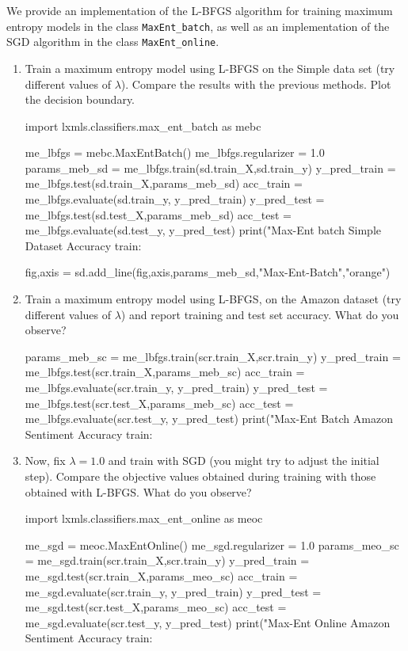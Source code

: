 \begin{exercise}
We provide an implementation of the L-BFGS algorithm for training maximum entropy models in the class {\tt MaxEnt\_batch}, 
as well as an implementation of the SGD algorithm in the class {\tt MaxEnt\_online}. 
\begin{enumerate}
\item Train a  maximum entropy model using L-BFGS on the Simple data
  set (try different values of $\lambda$). Compare the results with the previous methods. Plot the decision boundary. 
\begin{python}
import lxmls.classifiers.max_ent_batch as mebc

me_lbfgs = mebc.MaxEntBatch()
me_lbfgs.regularizer = 1.0
params_meb_sd = me_lbfgs.train(sd.train_X,sd.train_y)
y_pred_train = me_lbfgs.test(sd.train_X,params_meb_sd)
acc_train = me_lbfgs.evaluate(sd.train_y, y_pred_train)
y_pred_test = me_lbfgs.test(sd.test_X,params_meb_sd)
acc_test = me_lbfgs.evaluate(sd.test_y, y_pred_test)
print("Max-Ent batch Simple Dataset Accuracy train: %

fig,axis = sd.add_line(fig,axis,params_meb_sd,"Max-Ent-Batch","orange")
\end{python}

\item Train a maximum entropy model using L-BFGS, on the Amazon
  dataset (try different values of $\lambda$) and report training and test set accuracy. What do you observe? 
\begin{python}
params_meb_sc = me_lbfgs.train(scr.train_X,scr.train_y)
y_pred_train = me_lbfgs.test(scr.train_X,params_meb_sc)
acc_train = me_lbfgs.evaluate(scr.train_y, y_pred_train)
y_pred_test = me_lbfgs.test(scr.test_X,params_meb_sc)
acc_test = me_lbfgs.evaluate(scr.test_y, y_pred_test)
print("Max-Ent Batch Amazon Sentiment Accuracy train: %
\end{python}

\item Now, fix $\lambda = 1.0$ and train with SGD (you might try to adjust the initial step). 
Compare the objective values obtained during training with those obtained with L-BFGS. What do you observe? 
\begin{python}
import lxmls.classifiers.max_ent_online as meoc

me_sgd = meoc.MaxEntOnline()
me_sgd.regularizer = 1.0
params_meo_sc = me_sgd.train(scr.train_X,scr.train_y)
y_pred_train = me_sgd.test(scr.train_X,params_meo_sc)
acc_train = me_sgd.evaluate(scr.train_y, y_pred_train)
y_pred_test = me_sgd.test(scr.test_X,params_meo_sc)
acc_test = me_sgd.evaluate(scr.test_y, y_pred_test)
print("Max-Ent Online Amazon Sentiment Accuracy train: %
\end{python}
\end{enumerate}
\end{exercise}


